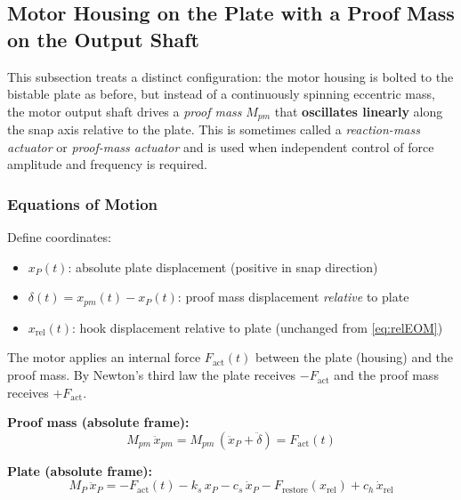 \documentclass[11pt,letterpaper]{article}
\begin{document}
\subsection{Motor Housing on the Plate with a Proof Mass on the Output Shaft}
\label{ssec:proof_mass}

This subsection treats a distinct configuration: the motor housing is bolted to
the bistable plate as before, but instead of a continuously spinning eccentric
mass, the motor output shaft drives a \emph{proof mass} $M_{pm}$ that
\textbf{oscillates linearly} along the snap axis relative to the plate.  This
is sometimes called a \emph{reaction-mass actuator} or \emph{proof-mass
actuator} and is used when independent control of force amplitude and frequency
is required.

\subsubsection{Equations of Motion}
\label{sssec:pm_eom}

Define coordinates:
\begin{itemize}[nosep]
  \item $x_P(t)$: absolute plate displacement (positive in snap direction)
  \item $\delta(t) = x_{pm}(t) - x_P(t)$: proof mass displacement \emph{relative} to plate
  \item $x_{\mathrm{rel}}(t)$: hook displacement relative to plate (unchanged from \cref{eq:relEOM})
\end{itemize}

The motor applies an internal force $F_{\mathrm{act}}(t)$ between the plate
(housing) and the proof mass.  By Newton's third law the plate receives
$-F_{\mathrm{act}}$ and the proof mass receives $+F_{\mathrm{act}}$.

\noindent\textbf{Proof mass (absolute frame):}
\begin{equation}
  M_{pm}\,\ddot{x}_{pm}
  = M_{pm}\,(\ddot{x}_P + \ddot{\delta})
  = F_{\mathrm{act}}(t)
  \label{eq:pm_eom}
\end{equation}

\noindent\textbf{Plate (absolute frame):}
\begin{equation}
  M_P\,\ddot{x}_P
  = -F_{\mathrm{act}}(t)
  - k_s\,x_P - c_s\,\dot{x}_P
  - F_{\mathrm{restore}}(x_{\mathrm{rel}}) + c_h\,\dot{x}_{\mathrm{rel}}
  \label{eq:plate_pm}
\end{equation}
\end{document}
